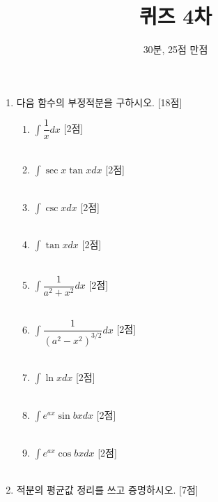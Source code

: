 \documentclass[12pt, a4paper]{article}
\title{퀴즈 4차}
\author{30분, 25점 만점}
\date{}
\begin{document}
\maketitle 
\begin{enumerate}
    \item  다음 함수의 부정적분을 구하시오. [18점]
    \begin{enumerate}
        \item $\displaystyle \int \dfrac{1}{x} dx$ [2점]\\ \\
        \item $\displaystyle \int \sec x \tan x dx$ [2점]\\ \\
        \item $\displaystyle \int \csc x dx$ [2점]\\ \\
        \item $\displaystyle \int \tan x dx$ [2점]\\ \\
        \item $\displaystyle \int \dfrac{1}{a^2 + x^2} dx$ [2점]\\ \\
        \item $\displaystyle \int \dfrac{1}{(a^2 - x^2)^{3/2}} dx$ [2점]\\ \\
        \item $\displaystyle \int \ln x dx$ [2점]\\ \\
        \item $\displaystyle \int e^{ax} \sin bx dx$ [2점]\\ \\
        \item $\displaystyle \int e^{ax} \cos bx dx$ [2점]\\ \\
    \end{enumerate} 

    \item 적분의 평균값 정리를 쓰고 증명하시오. [7점] \\ \\ \\ \\ \\ \\


\end{enumerate}
\end{document}
